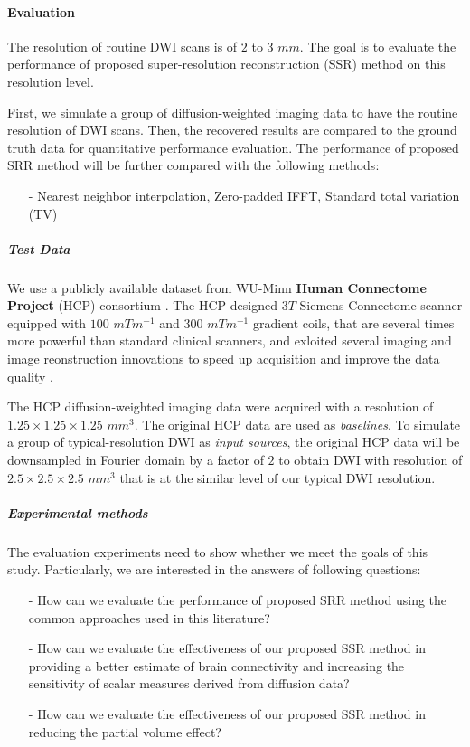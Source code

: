 \paragraph{Evaluation}

The resolution of routine DWI scans is of $2$ to $3$ $mm$. The goal is to evaluate the performance of proposed super-resolution reconstruction (SSR) method on this resolution level.

First, we simulate a group of diffusion-weighted imaging data to have the routine resolution of DWI scans. Then, the recovered results are compared to the ground truth data for quantitative performance evaluation.
The performance of proposed SRR method will be further compared with the following methods:
\begin{itemize}
\item[-] Nearest neighbor interpolation, Zero-padded IFFT, Standard total variation (TV)
\end{itemize}

\subparagraph{Test Data}
\label{HCPData}

We use a publicly available dataset from WU-Minn \textbf{Human Connectome Project} (HCP) consortium \cite{van2013,sotiropoulos2013}.
The HCP designed $3T$ Siemens Connectome scanner equipped with $100$ $mTm^{-1}$ and $300$ $mTm^{-1}$ gradient coils, that are several times more powerful than standard clinical scanners, and exloited several imaging and image reonstruction innovations to speed up acquisition and improve the data quality \cite{sotiropoulos2013}.

The HCP diffusion-weighted imaging data were acquired with a resolution of $1.25 \times 1.25 \times 1.25$ $mm^3$.
The original HCP data are used as \textit{baselines}.
To simulate a group of typical-resolution DWI as \textit{input sources}, the original HCP data will be downsampled in Fourier domain by a factor of $2$ to obtain DWI with resolution of $2.5 \times 2.5 \times 2.5$ $mm^3$ that is at the similar level of our typical DWI resolution.
\newline

\subparagraph{Experimental methods}

The evaluation experiments need to show whether we meet the goals of this study. Particularly, we are interested in the answers of following questions:
\begin{itemize}
    \item[-] How can we evaluate the performance of proposed SRR method using the common approaches used in this literature?
    \item[-] How can we evaluate the effectiveness of our proposed SSR method in providing a better estimate of brain connectivity and increasing the sensitivity of scalar measures derived from diffusion data?
    \item[-] How can we evaluate the effectiveness of our proposed SSR method in reducing the partial volume effect?
\end{itemize}

